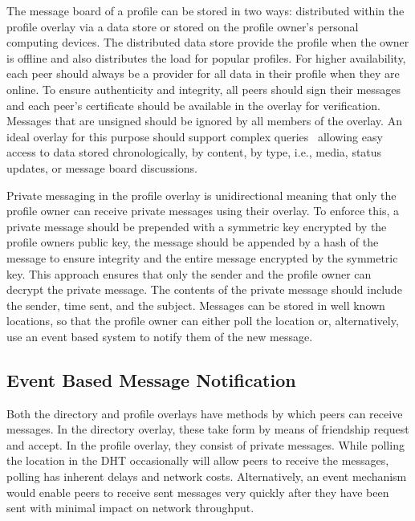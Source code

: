 \documentclass[conference]{IEEEtran}
\begin{document}
The message board of a profile can be stored in two ways: distributed within
the profile overlay via a data store or stored on the profile owner's personal
computing devices.  The distributed data store provide the profile when the
owner is offline and also distributes the load for popular profiles.  For
higher availability, each peer should always be a provider for all data in
their profile when they are online.  To ensure authenticity and integrity, all
peers should sign their messages and each peer's certificate should be
available in the overlay for verification.  Messages that are unsigned should
be ignored by all members of the overlay.  An ideal overlay for this purpose
should support complex queries~\cite{complex_queries} allowing easy access to
data stored chronologically, by content, by type, i.e., media, status updates,
or message board discussions.

Private messaging in the profile overlay is unidirectional meaning that only
the profile owner can receive private messages using their overlay.  To
enforce this, a private message should be prepended with a symmetric key
encrypted by the profile owners public key, the message should be appended by
a hash of the message to ensure integrity and the entire message encrypted by
the symmetric key.  This approach ensures that only the sender and the profile
owner can decrypt the private message.  The contents of the private message
should include the sender, time sent, and the subject.  Messages can be stored
in well known locations, so that the profile owner can either poll the
location or, alternatively, use an event based system to notify them of the
new message.

\subsection{Event Based Message Notification}

Both the directory and profile overlays have methods by which peers can receive
messages.  In the directory overlay, these take form by means of friendship
request and accept.  In the profile overlay, they consist of private messages.
While polling the location in the DHT occasionally will allow peers to
receive the messages, polling has inherent delays and network costs.
Alternatively, an event mechanism would enable peers to receive sent messages
very quickly after they have been sent with minimal impact on network
throughput.
\end{document}
